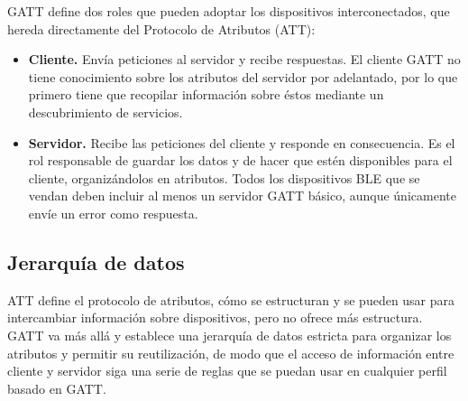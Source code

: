 GATT define dos roles que pueden adoptar los dispositivos interconectados, que hereda directamente del Protocolo de Atributos (ATT):
\begin{itemize}
	\item \textbf{Cliente.} Envía peticiones al servidor y recibe respuestas. El cliente GATT no tiene conocimiento sobre los atributos del servidor por adelantado, por lo que primero tiene que recopilar información sobre éstos mediante un descubrimiento de servicios.

	\item \textbf{Servidor.} Recibe las peticiones del cliente y responde en consecuencia. Es el rol responsable de guardar los datos y de hacer que estén disponibles para el cliente, organizándolos en atributos. Todos los dispositivos BLE que se vendan deben incluir al menos un servidor GATT básico, aunque únicamente envíe un error como respuesta.
\end{itemize}

\subsection{Jerarquía de datos}
\label{makereference2.4.2}

ATT define el protocolo de atributos, cómo se estructuran y se pueden usar para intercambiar información sobre dispositivos, pero no ofrece más estructura. GATT va más allá y establece una jerarquía de datos estricta para organizar los atributos y permitir su reutilización, de modo que el acceso de información entre cliente y servidor siga una serie de reglas que se puedan usar en cualquier perfil basado en GATT.

